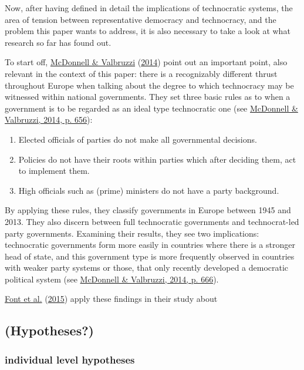 \documentclass[
  12pt,
  english,
]{article}
\providecommand{\tightlist}{%
  \setlength{\itemsep}{0pt}\setlength{\parskip}{0pt}}
\begin{document}
Now, after having defined in detail the implications of technocratic
systems, the area of tension between representative democracy and
technocracy, and the problem this paper wants to address, it is also
necessary to take a look at what research so far has found out.

To start off, \protect\hyperlink{ref-mcdonnell2014defining}{McDonnell \&
Valbruzzi} (\protect\hyperlink{ref-mcdonnell2014defining}{2014}) point
out an important point, also relevant in the context of this paper:
there is a recognizably different thrust throughout Europe when talking
about the degree to which technocracy may be witnessed within national
governments. They set three basic rules as to when a government is to be
regarded as an ideal type technocratic one (see
\protect\hyperlink{ref-mcdonnell2014defining}{McDonnell \& Valbruzzi,
2014, p. 656}):

\begin{enumerate}
\def\labelenumi{\arabic{enumi}.}
\tightlist
\item
  Elected officials of parties do not make all governmental decisions.
\item
  Policies do not have their roots within parties which after deciding
  them, act to implement them.
\item
  High officials such as (prime) ministers do not have a party
  background.
\end{enumerate}

By applying these rules, they classify governments in Europe between
1945 and 2013. They also discern between full technocratic governments
and technocrat-led party governments. Examining their results, they see
two implications: technocratic governments form more easily in countries
where there is a stronger head of state, and this government type is
more frequently observed in countries with weaker party systems or
those, that only recently developed a democratic political system (see
\protect\hyperlink{ref-mcdonnell2014defining}{McDonnell \& Valbruzzi,
2014, p. 666}).

\protect\hyperlink{ref-font2015participation}{Font et al.}
(\protect\hyperlink{ref-font2015participation}{2015}) apply these
findings in their study about

\hypertarget{hypotheses}{%
\subsection{(Hypotheses?)}\label{hypotheses}}

\hypertarget{individual-level-hypotheses}{%
\subsubsection{individual level
hypotheses}\label{individual-level-hypotheses}}
\end{document}
